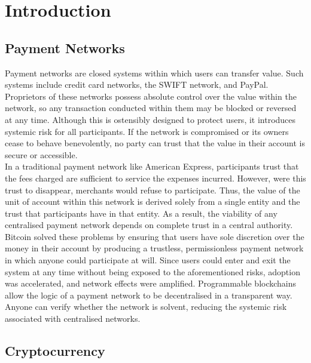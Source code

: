 \section{Introduction}

\subsection{Payment Networks}

\noindent Payment networks are closed systems within which users can transfer value. Such systems include credit card networks, the SWIFT network, and PayPal. Proprietors of these networks possess absolute control over the value within the network, so any transaction conducted within them may be blocked or reversed at any time. Although this is ostensibly designed to protect users, it introduces systemic risk for all participants. If the network is compromised or its owners cease to behave benevolently, no party can trust that the value in their account is secure or accessible. \\

\noindent In a traditional payment network like American Express, participants trust that the fees charged are sufficient to service the expenses incurred. However, were this trust to disappear, merchants would refuse to participate. Thus, the value of the unit of account within this network is derived solely from a single entity and the trust that participants have in that entity. As a result, the viability of any centralised payment network depends on complete trust in a central authority.  \\

\noindent Bitcoin solved these problems by ensuring that users have sole discretion over the money in their account by producing a trustless, permissionless payment network in which anyone could participate at will. Since users could enter and exit the system at any time without being exposed to the aforementioned risks, adoption was accelerated, and network effects were amplified. Programmable blockchains allow the logic of a payment network to be decentralised in a transparent way. Anyone can verify whether the network is solvent, reducing the systemic risk associated with centralised networks. 

\subsection{Cryptocurrency}

